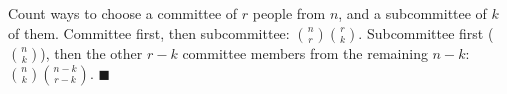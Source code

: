 Count ways to choose a committee of $r$ people from $n$, and a subcommittee of $k$ of them. Committee first, then subcommittee: $\binom nr\binom rk$. Subcommittee first ($\binom nk$), then the other $r-k$ committee members from the remaining $n-k$: $\binom nk\binom{n-k}{r-k}$. $\blacksquare$
